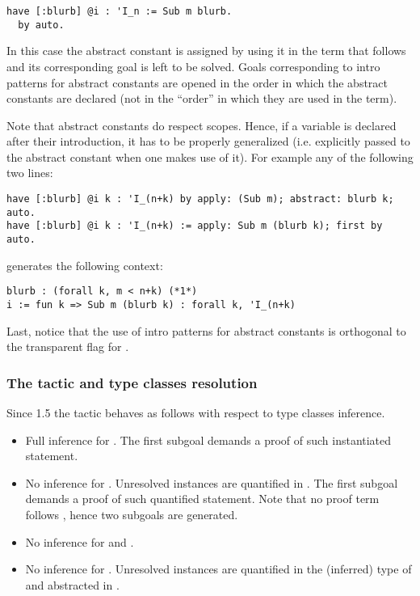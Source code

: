 \begin{lstlisting}
have [:blurb] @i : 'I_n := Sub m blurb.
  by auto.
\end{lstlisting}

In this case the abstract constant  is assigned by using it
in the term that follows \ssrC{:=} and its corresponding goal is left to
be solved.  Goals corresponding to intro patterns for abstract constants
are opened in the order in which the abstract constants are declared (not
in the ``order'' in which they are used in the term).

Note that abstract constants do respect scopes.  Hence, if a variable
is declared after their introduction, it has to be properly generalized (i.e.
explicitly passed to the abstract constant when one makes use of it).
For example any of the following two lines:
\begin{lstlisting}
have [:blurb] @i k : 'I_(n+k) by apply: (Sub m); abstract: blurb k; auto.
have [:blurb] @i k : 'I_(n+k) := apply: Sub m (blurb k); first by auto.
\end{lstlisting}
generates the following context:
\begin{lstlisting}
blurb : (forall k, m < n+k) (*1*)
i := fun k => Sub m (blurb k) : forall k, 'I_(n+k)
\end{lstlisting}

Last, notice that the use of intro patterns for abstract constants is
orthogonal to the transparent flag  for .

\subsubsection*{The  tactic and type classes resolution}
\label{ssec:havetcresolution}

Since \ssr{} 1.5 the  tactic behaves as follows with respect to type
classes inference.

\begin{itemize}
\item {}
	Full inference for .
	The first subgoal demands a proof of such instantiated statement.
\item {}
	No inference for . Unresolved instances are quantified in
	.  The first subgoal demands a proof of such quantified
	statement.  Note that no proof term follows \ssrC{:=}, hence two
	subgoals are generated.
\item {}
	No inference for  and .
\item {}
	No inference for . Unresolved instances are quantified in the
	(inferred) type of  and abstracted in .
\end{itemize}

